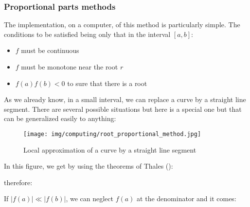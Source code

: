 	\subsubsection{Proportional parts methods}
	The implementation, on a computer, of this method is particularly simple. The conditions to be satisfied being only that in the interval $[a,b]$:
	\begin{itemize}
		\item $f$ must be continuous

		\item $f$ must be monotone near the root $r$
		
		\item $f(a)f(b)<0$ to sure that there is a root
	\end{itemize}
	As we already know, in a small interval, we can replace a curve by a straight line segment. There are several possible situations but here is a special one but that can be generalized easily to anything:
	
	\begin{figure}[H]
		\centering
		\texttt{[image: img/computing/root\_proportional\_method.jpg]}
		\caption{Local approximation of a curve by a straight line segment}
	\end{figure}
	In this figure, we get by using the theorems of Thales ():
	
	therefore:
	
	If $|f(a)| \ll |f(b)|$, we can neglect $f(a)$ at the denominator and it comes:
	
